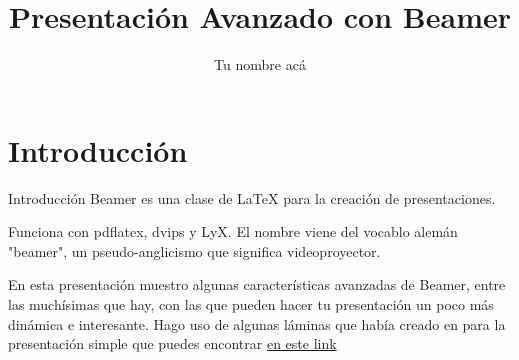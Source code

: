 \documentclass[a4paper,10pt]{beamer}
\begin{document}
\begin{frame}
\title{Presentaci\'on Avanzado con Beamer}
\author{Tu nombre ac\'a}
\date{}
\maketitle
\end{frame}

\section[\'Indice]{}

\section{Introducci\'on}
\begin{frame}{Introducci\'on}
\justify
Beamer es una clase de LaTeX para la creaci\'on de
presentaciones.

\vspace{0.3cm}
\begin{justify}
Funciona con pdflatex, dvips y LyX. El nombre 
viene del vocablo alem\'an "beamer", un pseudo-anglicismo 
que significa videoproyector. 

\vspace{0.3cm}

En esta presentaci\'on muestro algunas caracter\'isticas avanzadas
de Beamer, entre las much\'isimas que hay, con las que pueden
hacer tu presentaci\'on un poco m\'as din\'amica e interesante.
Hago uso de algunas l\'aminas que hab\'ia creado en para la 
presentaci\'on simple que puedes encontrar \href{https://github.com/FavioVazquez/Presentacion\_Beamer\_Simple}{\color{blue} en este link}
\end{justify}
\end{frame}
\end{document}
